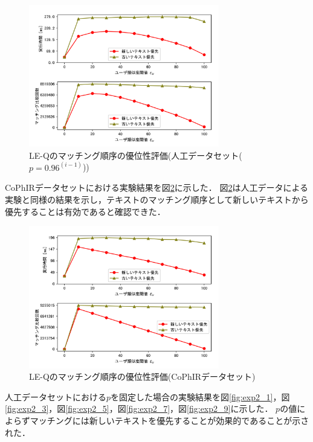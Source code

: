 \begin{figure}[H]
    \centering
    \includegraphics[width=8.3cm]{eimg/exp2.png}
    \caption{LE-Qのマッチング順序の優位性評価(人工データセット($p=0.96^{(i-1)}$))}
    \label{fig:exp2}
\end{figure}
CoPhIRデータセットにおける実験結果を図\ref{fig:exp2_c}に示した．
図\ref{fig:exp2_c}は人工データによる実験と同様の結果を示し，テキストのマッチング順序として新しいテキストから優先することは有効であると確認できた．
\begin{figure}[H]
    \centering
    \includegraphics[width=8.3cm]{eimg/exp2_c.png}
    \caption{LE-Qのマッチング順序の優位性評価(CoPhIRデータセット)}
    \label{fig:exp2_c}
\end{figure}

人工データセットにおける$p$を固定した場合の実験結果を図\ref{fig:exp2_1}，図\ref{fig:exp2_3}，図\ref{fig:exp2_5}，図\ref{fig:exp2_7}，図\ref{fig:exp2_9}に示した．
$p$の値によらずマッチングには新しいテキストを優先することが効果的であることが示された．

